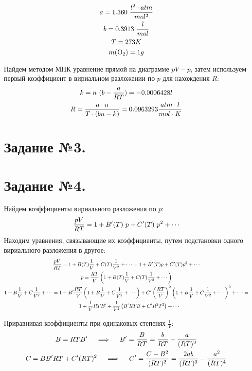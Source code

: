 \documentclass[a4paper]{article}
\begin{document}
\begin{gather}
a = 1.360 \ \frac{l^2 \cdot atm}{mol^2} \notag \\
b = 0.3913 \ \frac{l}{mol} \notag \\
T = 273 K \notag \\
m (\ce{O}_2) = 1 g \notag
\end{gather}

Найдем методом МНК уравнение прямой на диаграмме $pV - p$, затем используем первый коэффициент в вириальном разложении по $p$ для нахождения $R$:
\begin{gather}
k = n \ (b - \frac{a}{RT} ) = -0.0006428 l \notag \\
R = \frac{a \cdot n}{T \cdot (bn - k)} = 0.0963293 \frac{atm \cdot l}{mol \cdot K}\notag
\end{gather}

\section{Задание №3.}

\section{Задание №4.}
Найдем коэффициенты вириального разложения по $p$:
\begin{gather}
\frac{p V}{R T} = 1 + B^\prime (T)\ p + C^\prime (T) \ p^2 + \cdots \notag 
\end{gather}
Находим уравнения, связывающие их коэффициенты, путем подстановки одного вириального разложения в другое:
\begin{gather}
\frac{p V}{R T} = 1 + B(T) \frac{1}{V} + C(T) \frac{1}{V^2} + \cdots = 1 + B^\prime (T) p + C^\prime (T) p^2 + \cdots \notag \\
p = \frac{RT}{V} \left( 1 + B(T) \frac{1}{V} + C(T) \frac{1}{V^2} + \cdots \right) \notag \\
1 + B \frac{1}{V} + C \frac{1}{V^2} + \cdots = 1 + B^\prime \frac{RT}{V} \left( 1 + B \frac{1}{V} + C \frac{1}{V^2} + \cdots \right)
+ C^\prime \left( \frac{RT}{V} \right)^2 \left( 1 + B \frac{1}{V} + C \frac{1}{V^2} + \cdots \right)^2 + \cdots = \notag \\
= 1 + \frac{1}{V} RT B^\prime + \frac{1}{V^2} \left( B^\prime RT B + C^\prime R^2 T^2 \right) + \cdots \notag
\end{gather}

Приравнивая коэффициенты при одинаковых степенях $\frac{1}{V}$:
\begin{gather}
B = RT B^\prime \quad \implies \quad B^\prime = \frac{B}{RT} = \frac{b}{RT} - \frac{a}{(RT)^2} \notag \\
C = B B^\prime RT + C^\prime (RT)^2 \quad \implies \quad C^\prime = \frac{C - B^2}{(RT)^2} = \frac{2ab}{(RT)^3} - \frac{a^2}{(RT)^4} \notag
\end{gather}
\end{document}
